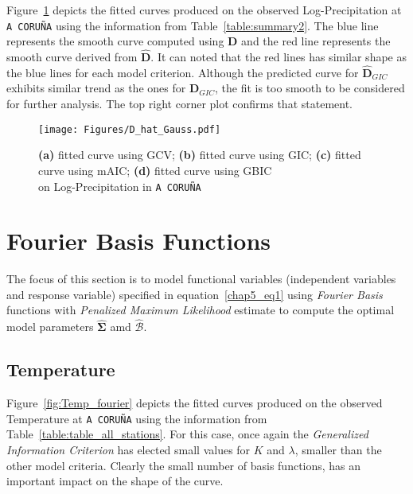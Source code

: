 Figure~\ref{fig:logprec_Gauss} depicts the fitted curves produced on the observed Log-Precipitation at \texttt{A CORUÑA} using the information from Table~\ref{table:summary2}. The blue line represents the smooth curve computed using $\bm{D}$ and the red line represents the smooth curve derived from $\bm{\hat{D}}$. It can noted that the red lines has similar shape as the blue lines for each model criterion. Although the predicted curve for $\bm{\hat{D}}_{GIC}$ exhibits similar trend as the ones for $\bm{D}_{GIC}$, the fit is too smooth to be considered for further analysis. The top right corner plot confirms that statement. 

\newpage
\begin{landscape}
\thispagestyle{empty}
\begin{figure}[p]
  \centering
    \texttt{[image: Figures/D\_hat\_Gauss.pdf]}
  \caption[Fitting Wind Speed with \textit{Gaussian basis function} on \texttt{A CORUÑA} station]{\textbf{(a)} fitted curve using GCV; \textbf{(b)} fitted curve using GIC; \textbf{(c)} fitted curve using mAIC; \textbf{(d)} fitted curve using GBIC \\ on Log-Precipitation in \texttt{A CORUÑA}}
  \label{fig:logprec_Gauss}
\end{figure}
\end{landscape}   
\newpage

\section{Fourier Basis Functions}

The focus of this section is to model functional variables (independent variables and response variable) specified in equation~\eqref{chap5_eq1} using \textit{Fourier Basis} functions with \textit{Penalized Maximum Likelihood} estimate to compute the optimal model parameters $\hat{\bm{\Sigma}}$ amd $\hat{\bm{\mathcal{B}}}$.

\subsection{Temperature}
Figure~\ref{fig:Temp_fourier} depicts the fitted curves produced on the observed Temperature at \texttt{A CORUÑA} using the information from Table~\ref{table:table_all_stations}. For this case, once again the \textit{Generalized Information Criterion} has elected small values for $K$ and $\lambda$, smaller than the other model criteria. Clearly the small number of basis functions, has an important impact on the shape of the curve.

